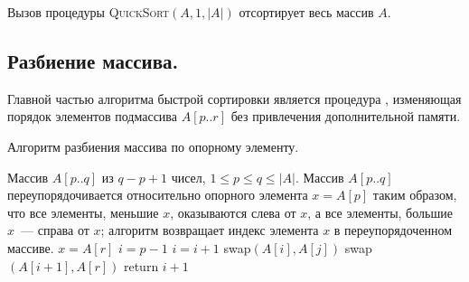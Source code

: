 \documentclass[a4paper,12pt]{article}
\begin{document}
Вызов процедуры \textsc{QuickSort}$(A, 1, |A|)$ отсортирует весь массив $A$.

\subsection{Разбиение массива.}

Главной частью алгоритма быстрой сортировки является процедура , изменяющая порядок элементов подмассива $A[p..r]$ без привлечения дополнительной памяти.

\begin{algorithm}[H]
	\caption{Алгоритм разбиения массива по опорному элементу.}
	\label{algo:partition}
	\begin{algorithmic}[1]
		\Require Массив $A[p..q]$ из $q - p + 1$ чисел, $1 \leq p \leq q \leq |A|$. 
		\Ensure Массив $A[p..q]$ переупорядочивается относительно опорного элемента $x = A[p]$ таким образом, что все элементы, меньшие $x$, оказываются слева от $x$, а все элементы, большие $x$~--- справа от $x$; алгоритм возвращает индекс элемента $x$ в переупорядоченном массиве.
		\State $x = A[r]$
		\State $i = p - 1$
				\State $i = i + 1$
				\State swap$(A[i], A[j])$
			\EndIf
		\EndFor
		\State swap$(A[i + 1], A[r])$
		\State return $i + 1$
	\end{algorithmic}
\end{algorithm}
\end{document}
